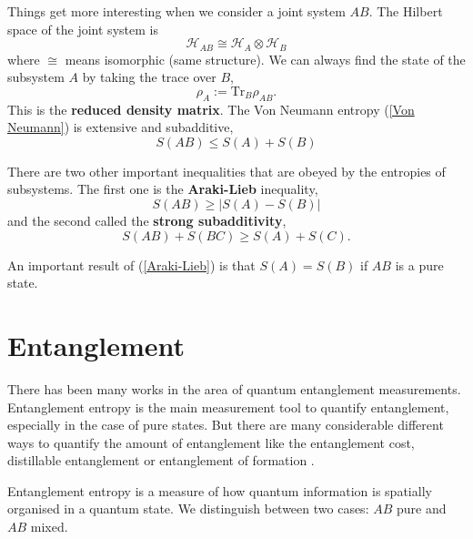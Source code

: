 Things get more interesting when we consider a joint system $AB$. The Hilbert space of the joint system is
\begin{equation}
    \mathcal{H}_{AB}\cong \mathcal{H}_A\otimes\mathcal{H}_B    
\end{equation}
where $\cong$ means isomorphic (same structure). We can always find the state of the subsystem $A$ by taking the trace over $B$,
\begin{equation}
    \rho_A := \text{Tr}_B\rho_{AB}.
\end{equation}
This is the \textbf{reduced density matrix}. The Von Neumann entropy (\ref{Von Neumann}) is extensive and subadditive,
\begin{equation}
    S\left(AB\right) \leq S\left(A\right) + S\left(B\right)
\end{equation}

There are two other important inequalities that are obeyed by the entropies of subsystems. The first one is the \textbf{Araki-Lieb} inequality,
\begin{equation}\label{Araki-Lieb}
    S\left(AB\right) \geq \left|S\left(A\right) - S\left(B\right)\right|
\end{equation}
and the second called the \textbf{strong subadditivity},
\begin{equation}\label{weak monotonicity}
    S\left(AB\right) + S\left(BC\right) \geq S\left(A\right) + S\left(C\right).
\end{equation}

An important result of (\ref{Araki-Lieb}) is that $S\left(A\right) = S\left(B\right)$ if $AB$ is a pure state.

\section{Entanglement}
There has been many works in the area of quantum entanglement measurements. Entanglement entropy is the main measurement tool to quantify entanglement, especially in the case of pure states. But there are many considerable different ways to quantify the amount of entanglement like the entanglement cost, distillable entanglement or entanglement of formation \cite{Virmani}.

Entanglement entropy  is a measure of how quantum information is spatially organised in a quantum state. We distinguish between two cases: $AB$ pure and $AB$ mixed.

